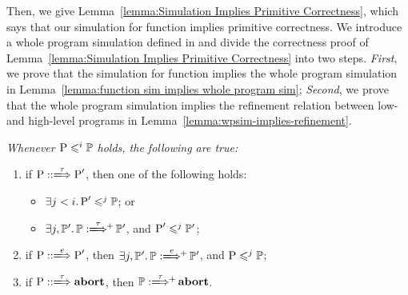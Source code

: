 {Then, we give
Lemma~\ref{lemma:Simulation Implies Primitive Correctness},
which says that our simulation for function implies
primitive correctness. We introduce a whole program
simulation defined in \Def{\ref{def:wpsim}} and divide
the correctness proof of
Lemma~\ref{lemma:Simulation Implies Primitive Correctness}
into two steps.
\textit{First}, we prove
that the simulation for function implies
the whole program simulation in
Lemma~\ref{lemma:function sim implies whole program sim};
\textit{Second}, we prove that
the whole program simulation implies the refinement relation
between low- and high-level programs in
Lemma~\ref{lemma:wpsim-implies-refinement}.
\begin{definition}
    \label{def:wpsim}
    \em
    Whenever $\text{P} \leqslant^{i} \mathbb{P}$ holds,
    the following are true:
    \begin{enumerate}[1.]
        \small
        \item if $\LGlobTrans{\prog}{\tau}{\prog'}$,
            then one of the following holds:
            \begin{itemize}
                \item $\exists j < i. \,
                    \text{P}' \leqslant^{j} \mathbb{P}$; or
                \item $\exists j, \HProg'. \,
                    \HGlobMultiTrans{\HProg}{\tau}{+}{\HProg'}$,
                    and $\text{P}' \leqslant^{j} \mathbb{P}'$;
            \end{itemize}
        \item if $\LGlobTrans{\prog}{\event}{\prog'}$,
            then $\exists j, \HProg'. \,
            \HGlobMultiTrans{\HProg}{\event}{+}{\HProg'}$,
            and $\text{P} \leqslant^{j} \mathbb{P}$;
        \item if $\LGlobTrans{\prog}{\tau}{\evtabort}$,
            then $\HGlobMultiTrans{\HProg}{\tau}{+}{\evtabort}$.
    \end{enumerate}
\end{definition}

}
